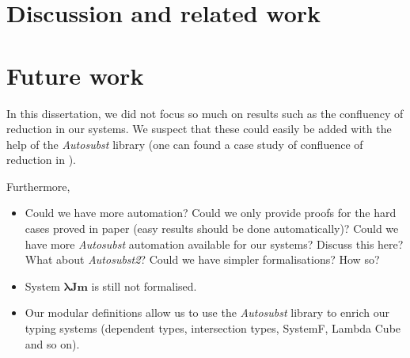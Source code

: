 
\section{Discussion and related work}


\section{Future work}

In this dissertation, we did not focus so much on results such as the confluency of reduction in our systems.
We suspect that these could easily be added with the help of the \textit{Autosubst} library (one can found a case study of confluence of reduction in \cite[Section~2.2]{AutosubstSchafer}).

Furthermore,
\begin{itemize}
\item Could we have more automation?
  \subitem Could we only provide proofs for the hard cases proved in paper (easy results should be done automatically)?
  \subitem Could we have more \textit{Autosubst} automation available for our systems? Discuss this here? What about \textit{Autosubst2}?
  \subitem Could we have simpler formalisations? How so?
\item System $\pmb{\lambda Jm}$ is still not formalised.
\item Our modular definitions allow us to use the \textit{Autosubst} library to enrich our typing systems (dependent types, intersection types, SystemF, Lambda Cube and so on).

\end{itemize}

